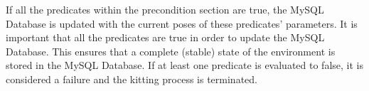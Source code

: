\begin{enumerate}
\end{enumerate}
%


If all the predicates within the precondition section are true, the \textsf{MySQL Database} is updated with the current poses of these predicates' parameters. It is important that all the predicates are true in order to update the \textsf{MySQL Database}. This ensures that a complete (stable) state of the environment is stored in the \textsf{MySQL Database}. If at least one predicate is evaluated to false, it is considered a failure and the kitting process is terminated.

